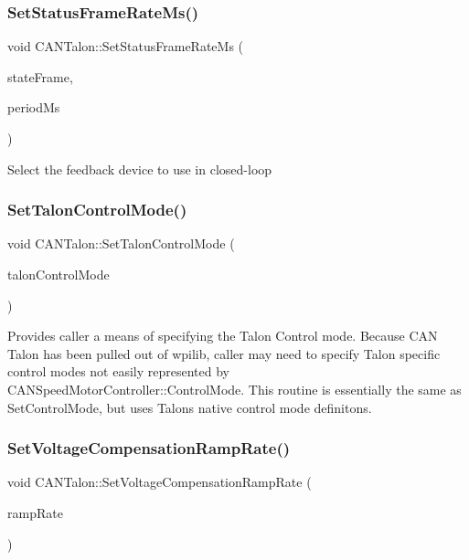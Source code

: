 \subsubsection{\texorpdfstring{Set\+Status\+Frame\+Rate\+Ms()}{SetStatusFrameRateMs()}}
{\footnotesize\ttfamily void C\+A\+N\+Talon\+::\+Set\+Status\+Frame\+Rate\+Ms (\begin{DoxyParamCaption}\item[{\hyperlink{class_c_a_n_talon_acac4ef6508d842a8fe4301284149720e}{Status\+Frame\+Rate}}]{state\+Frame,  }\item[{int}]{period\+Ms }\end{DoxyParamCaption})}

Select the feedback device to use in closed-\/loop \mbox{\label{class_c_a_n_talon_a08d03dbd23a98e7af25fee772f680f43}} 
\subsubsection{\texorpdfstring{Set\+Talon\+Control\+Mode()}{SetTalonControlMode()}}
{\footnotesize\ttfamily void C\+A\+N\+Talon\+::\+Set\+Talon\+Control\+Mode (\begin{DoxyParamCaption}\item[{\hyperlink{class_c_a_n_talon_a0e4915b95f71a7091e3a1323f3ec9e1f}{Talon\+Control\+Mode}}]{talon\+Control\+Mode }\end{DoxyParamCaption})}



Provides caller a means of specifying the Talon Control mode. Because C\+AN Talon has been pulled out of wpilib, caller may need to specify Talon specific control modes not easily represented by C\+A\+N\+Speed\+Motor\+Controller\+::\+Control\+Mode. This routine is essentially the same as Set\+Control\+Mode, but uses Talon\textquotesingle{}s native control mode definitons. 

\mbox{\label{class_c_a_n_talon_a3608afbdaa6a0c4e9c63c70bbcae38ed}} 
\subsubsection{\texorpdfstring{Set\+Voltage\+Compensation\+Ramp\+Rate()}{SetVoltageCompensationRampRate()}}
{\footnotesize\ttfamily void C\+A\+N\+Talon\+::\+Set\+Voltage\+Compensation\+Ramp\+Rate (\begin{DoxyParamCaption}\item[{double}]{ramp\+Rate }\end{DoxyParamCaption})\hspace{0.3cm}{\ttfamily [virtual]}}

